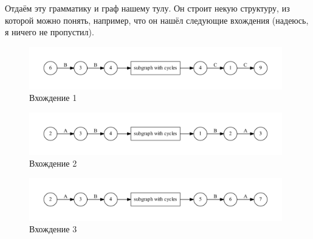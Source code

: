 \documentclass[a5paper]{article}
\begin{document}
Отдаём эту грамматику и граф нашему тулу. Он строит некую структуру, из которой можно понять, например, что он нашёл следующие вхождения (надеюсь, я ничего не пропустил).

\begin{figure}
    \begin{center}
        \includegraphics[width=11cm]{out1.pdf}
        \caption{Вхождение 1}
        \label{pic1}        
    \end{center}
\end{figure}

\begin{figure}
    \begin{center}
        \includegraphics[width=11cm]{out2.pdf}
        \caption{Вхождение 2}
        \label{pic1}        
    \end{center}
\end{figure}

\begin{figure}
    \begin{center}
        \includegraphics[width=11cm]{out3.pdf}
        \caption{Вхождение 3}
        \label{pic1}        
    \end{center}
\end{figure}


  


\end{document}
